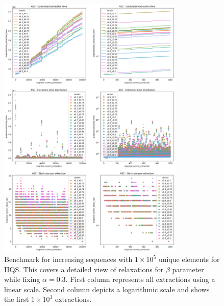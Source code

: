 \begin{figure}[!ht]
    \centering
    \includegraphics[width=0.79\textwidth]{./fragments/04_experimental_execution/images/04_alphabeta_detail_increasing_right.png}
    \caption{Benchmark for increasing sequences with $1\times10^5$ unique elements for IIQS. This covers a detailed view of relaxations for $\beta$ parameter while fixing $\alpha=0.3$.  First column represents all extractions using a linear scale. Second column depicts a logarithmic scale and shows the first $1\times10^3$ extractions. }
    \label{FIG:05_ALPHABETA_BENCHMARK_ASC_RIGHT}
\end{figure}

